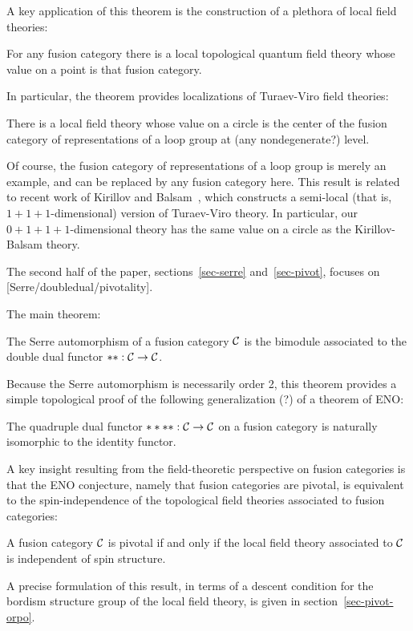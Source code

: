 \documentclass{amsart}
\begin{document}
A key application of this theorem is the construction of a plethora of local field theories:
\begin{corollary}
For any fusion category there is a local topological quantum field theory whose value on a point is that fusion category.
\end{corollary}

In particular, the theorem provides localizations of Turaev-Viro field theories:
\begin{corollary}
There is a local field theory whose value on a circle is the center of the fusion category of representations of a loop group at (any nondegenerate?) level.
\end{corollary}
Of course, the fusion category of representations of a loop group is merely an example, and can be replaced by any fusion category here.  This result is related to recent work of Kirillov and Balsam~\cite{kirillovbalsam}, which constructs a semi-local (that is, $1+1+1$-dimensional) version of Turaev-Viro theory.  In particular, our $0+1+1+1$-dimensional theory has the same value on a circle as the Kirillov-Balsam theory.  


The second half of the paper, sections~\ref{sec-serre} and~\ref{sec-pivot}, focuses on [Serre/doubledual/pivotality].

The main theorem:
\begin{theorem}
The Serre automorphism of a fusion category $\mathcal C$ is the bimodule associated to the double dual functor $**: \mathcal C \rightarrow \mathcal C$.
\end{theorem}

Because the Serre automorphism is necessarily order 2, this theorem provides a simple topological proof of the following generalization (?) of a theorem of ENO:
\begin{corollary}
The quadruple dual functor $****: \mathcal C \rightarrow \mathcal C$ on a fusion category is naturally isomorphic to the identity functor.
\end{corollary}

A key insight resulting from the field-theoretic perspective on fusion categories is that the ENO conjecture, namely that fusion categories are pivotal, is equivalent to the spin-independence of the topological field theories associated to fusion categories:
\begin{theorem}
A fusion category $\mathcal C$ is pivotal if and only if the local field theory associated to $\mathcal C$ is independent of spin structure.
\end{theorem}
A precise formulation of this result, in terms of a descent condition for the bordism structure group of the local field theory, is given in section~\ref{sec-pivot-orpo}.
\end{document}
